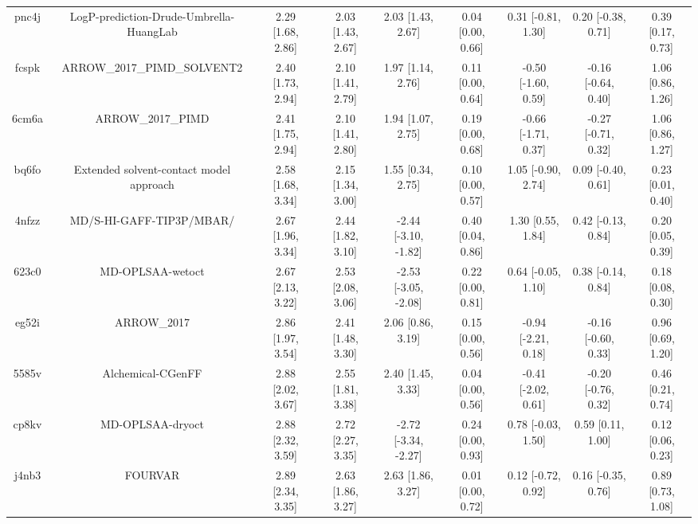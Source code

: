 \documentclass{article}
\begin{document}
\begin{center}
\begin{longtable}{|ccccccccc|}
 pnc4j &            LogP-prediction-Drude-Umbrella-HuangLab &  2.29 [1.68, 2.86] &  2.03 [1.43, 2.67] &     2.03 [1.43, 2.67] &  0.04 [0.00, 0.66] &   0.31 [-0.81, 1.30] &   0.20 [-0.38, 0.71] &     0.39 [0.17, 0.73] \\
 fcspk &                        ARROW\_2017\_PIMD\_SOLVENT2 &  2.40 [1.73, 2.94] &  2.10 [1.41, 2.79] &     1.97 [1.14, 2.76] &  0.11 [0.00, 0.64] &  -0.50 [-1.60, 0.59] &  -0.16 [-0.64, 0.40] &     1.06 [0.86, 1.26] \\
 6cm6a &                                  ARROW\_2017\_PIMD &  2.41 [1.75, 2.94] &  2.10 [1.41, 2.80] &     1.94 [1.07, 2.75] &  0.19 [0.00, 0.68] &  -0.66 [-1.71, 0.37] &  -0.27 [-0.71, 0.32] &     1.06 [0.86, 1.27] \\
 bq6fo &            Extended solvent-contact model approach &  2.58 [1.68, 3.34] &  2.15 [1.34, 3.00] &     1.55 [0.34, 2.75] &  0.10 [0.00, 0.57] &   1.05 [-0.90, 2.74] &   0.09 [-0.40, 0.61] &     0.23 [0.01, 0.40] \\
 4nfzz &                           MD/S-HI-GAFF-TIP3P/MBAR/ &  2.67 [1.96, 3.34] &  2.44 [1.82, 3.10] &  -2.44 [-3.10, -1.82] &  0.40 [0.04, 0.86] &    1.30 [0.55, 1.84] &   0.42 [-0.13, 0.84] &     0.20 [0.05, 0.39] \\
 623c0 &                                   MD-OPLSAA-wetoct &  2.67 [2.13, 3.22] &  2.53 [2.08, 3.06] &  -2.53 [-3.05, -2.08] &  0.22 [0.00, 0.81] &   0.64 [-0.05, 1.10] &   0.38 [-0.14, 0.84] &     0.18 [0.08, 0.30] \\
 eg52i &                                        ARROW\_2017 &  2.86 [1.97, 3.54] &  2.41 [1.48, 3.30] &     2.06 [0.86, 3.19] &  0.15 [0.00, 0.56] &  -0.94 [-2.21, 0.18] &  -0.16 [-0.60, 0.33] &     0.96 [0.69, 1.20] \\
 5585v &                                  Alchemical-CGenFF &  2.88 [2.02, 3.67] &  2.55 [1.81, 3.38] &     2.40 [1.45, 3.33] &  0.04 [0.00, 0.56] &  -0.41 [-2.02, 0.61] &  -0.20 [-0.76, 0.32] &     0.46 [0.21, 0.74] \\
 cp8kv &                                   MD-OPLSAA-dryoct &  2.88 [2.32, 3.59] &  2.72 [2.27, 3.35] &  -2.72 [-3.34, -2.27] &  0.24 [0.00, 0.93] &   0.78 [-0.03, 1.50] &    0.59 [0.11, 1.00] &     0.12 [0.06, 0.23] \\
 j4nb3 &                                            FOURVAR &  2.89 [2.34, 3.35] &  2.63 [1.86, 3.27] &     2.63 [1.86, 3.27] &  0.01 [0.00, 0.72] &   0.12 [-0.72, 0.92] &   0.16 [-0.35, 0.76] &     0.89 [0.73, 1.08] \\

\end{longtable}
\end{center}
\end{document}
